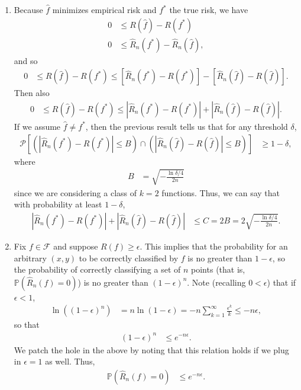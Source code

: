 \documentclass[11pt,letterpaper]{article}
\newcommand{\e}{\epsilon}
\numberwithin{equation}{section}
\numberwithin{figure}{section}
\begin{document}
\begin{enumerate}
\begin{enumerate}
		\item Because $\hat{f}$ minimizes empirical risk and $f^\ast$ the true risk, we have
		\begin{align*}
			0 &\leq R(\hat{f}) - R(f^\ast)\\
			0 &\leq \hat{R}_n(f^\ast) - \hat{R}_n(\hat{f}),
		\end{align*}
		and so
		\begin{align*}
			0 &\leq R(\hat{f})-R(f^\ast) \leq [\hat{R}_n(f^\ast) - R(f^\ast)] - [\hat{R}_n(\hat{f}) - R(\hat{f})].
		\end{align*}
		Then also
		\begin{align*}
			0 &\leq R(\hat{f})-R(f^\ast) \leq \left|\hat{R}_n(f^\ast) - R(f^\ast)\right| + \left|\hat{R}_n(\hat{f}) - R(\hat{f})\right|.
		\end{align*}
		If we assume $\hat{f} \neq f^\ast$, then the previous result tells us that for any threshold $\delta$,
		\begin{align*}
			\mathcal{P}\left[ \left(\left|\hat{R}_n(f^\ast) - R(f^\ast)\right| \leq B\right) \cap \left(\left|\hat{R}_n(\hat{f}) - R(\hat{f})\right| \leq B\right)\right] &\geq 1-\delta,
		\end{align*}
		where
		\begin{align*}
			B &= \sqrt{-\frac{\ln \delta/4}{2n}}
		\end{align*}
		since we are considering a class of $k=2$ functions. Thus, we can say that with probability at least $1-\delta$,
		\begin{align*}
			 \left|\hat{R}_n(f^\ast) - R(f^\ast)\right| + \left|\hat{R}_n(\hat{f}) - R(\hat{f})\right| &\leq C = 2B = 2\sqrt{-\frac{\ln \delta/4}{2n}}.
		\end{align*}












		\item Fix $f\in \mathcal{F}$ and suppose $R(f) \geq \e$. This implies that the probability for an arbitrary $(x,y)$ to be correctly classified by $f$ is no greater than $1-\e$, so the probability of correctly classifying a set of $n$ points (that is, $\mathbb{P}(\hat{R}_n(f) = 0)$) is no greater than $(1-\e)^n$. Note (recalling $0 < \e$) that if $\e<1$,
		\begin{align*}
			\ln\left((1-\e)^n\right) &= n \ln(1-\e) = -n \sum_{k=1}^\infty \frac{\e^k}{k} \leq -n \e,
		\end{align*}
		so that
		\begin{align*}
			(1-\e)^n &\leq e^{-n \e}.
		\end{align*}
		We patch the hole in the above by noting that this relation holds if we plug in $\e =1$ as well. Thus,
		\begin{align*}
			\mathbb{P}(\hat{R}_n(f) = 0) &\leq e^{-n \e}.
		\end{align*}


\end{enumerate}
\end{enumerate}
\end{document}
